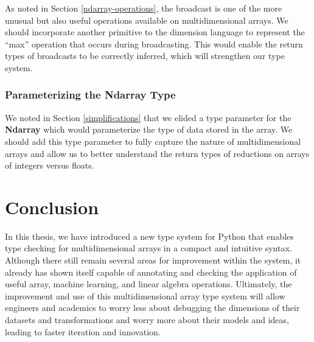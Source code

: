 \documentclass[12pt]{report}
\begin{document}
As noted in Section \ref{ndarray-operations}, the broadcast is one of the more unusual but also useful operations available on multidimensional arrays. We should incorporate another primitive to the dimension language to represent the ``max'' operation that occurs during broadcasting. This would enable the return types of broadcasts to be correctly inferred, which will strengthen our type system.

\subsection{Parameterizing the Ndarray Type}

We noted in Section \ref{simplifications} that we elided a type parameter for the \textbf{Ndarray} which would parameterize the type of data stored in the array. We should add this type parameter to fully capture the nature of multidimensional arrays and allow us to better understand the return types of reductions on arrays of integers versus floats.

\chapter{Conclusion}

In this thesis, we have introduced a new type system for Python that enables type checking for multidimensional arrays in a compact and intuitive syntax. Although there still remain several areas for improvement within the system, it already has shown itself capable of annotating and checking the application of useful array, machine learning, and linear algebra operations. Ultimately, the improvement and use of this multidimensional array type system will allow engineers and academics to worry less about debugging the dimensions of their datasets and transformations and worry more about their models and ideas, leading to faster iteration and innovation.




\end{document}
